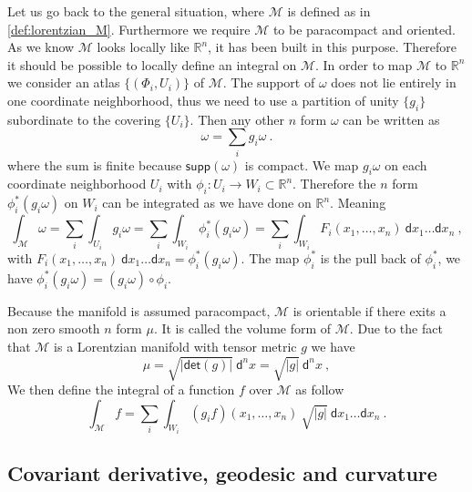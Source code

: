 \documentclass[12pt]{book}
\newcommand{\supp}{\mathsf{supp}}
\renewcommand{\det}{\mathsf{det}}
\newcommand{\abs}[1]{\left|#1\right|}
\let\int\int
\newcommand{\Mcal}{\mathcal{M}}
\newcommand{\Rbb}{\mathbb{R}}
\newcommand{\dsf}{\mathsf{d}}
\theoremstyle{break}
\begin{document}


Let us go back to the general situation, where $\Mcal$ is defined as in \ref{def:lorentzian_M}. Furthermore we require $\Mcal$ to be paracompact and oriented. As we know $\Mcal$ looks locally like $\Rbb^n$, it has been built in this purpose. Therefore it should be possible to locally define an integral on $\Mcal$. In order to map $\Mcal$ to $\Rbb^n$ we consider an atlas $\{(\Phi_i,U_i)\}$ of $\Mcal$. The support of $\omega$ does not lie entirely in one coordinate neighborhood, thus we need to use a partition of unity $\{g_i\}$ subordinate to the covering $\{U_i\}$. Then any other $n$ form $\omega$ can be written as
%
\begin{equation*}
\omega = \sum_{i} g_i \omega \ .
\end{equation*}
%
where the sum is finite because $\supp(\omega)$ is compact. We map $g_i \omega$ on each coordinate neighborhood $U_i$ with $\phi_i : U_i \to W_i \subset \Rbb^n$. Therefore the $n$ form $\phi_i ^\ast (g_i\omega)$ on $W_i$ can be integrated as we have done on $\Rbb^n$. Meaning
%
\begin{equation*}
\int_\Mcal \omega = \sum_i \int_{U_i} g_i \omega = \sum_i \int_{W_i} \phi_i ^\ast (g_i\omega) = \sum_i \int_{W_i} F_i(x_1,\dots,x_n) \ \dsf x_1 \dots \dsf x_n \ ,
\end{equation*} 
%
with $F_i(x_1,\dots,x_n) \ \dsf x_1 \dots \dsf x_n = \phi_i ^\ast (g_i\omega)$. The map $\phi_i ^\ast$ is the pull back of $\phi_i ^\ast$, we have $\phi_i ^\ast(g_i\omega) = (g_i\omega) \circ \phi_i$.





Because the manifold is assumed paracompact, $\Mcal$ is orientable if there exits a non zero smooth $n$ form $\mu$. It is called the volume form of $\Mcal$. Due to the fact that $\Mcal$ is a Lorentzian manifold with tensor metric $g$ we have 
%
\begin{equation*}
\mu = \sqrt{\abs{\det\left(g\right)}} \ \dsf^n x = \sqrt{\abs{g}} \ \dsf^n x \ ,
\end{equation*}
%
We then define the integral of a function $f$ over $\Mcal$ as follow
%
\begin{equation*}
\int_\Mcal f = \sum_i \int_{W_i} (g_i f)(x_1,\dots,x_n) \ \sqrt{\abs{g}} \ \dsf x_1 \dots \dsf x_n \ .
\label{eq:int_manifold}
\end{equation*}


\subsection{Covariant derivative, geodesic and curvature}
\end{document}
